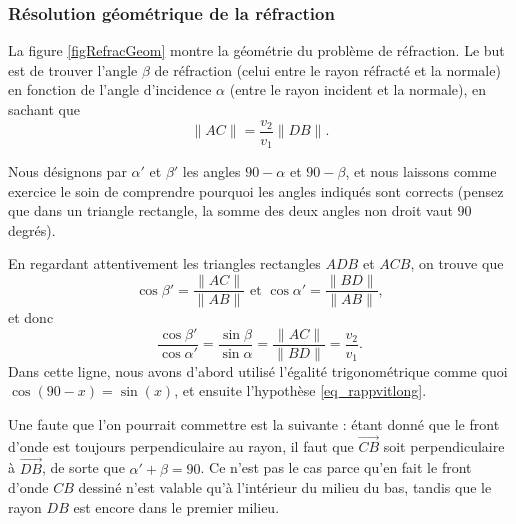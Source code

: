 \subsubsection{Résolution géométrique de la réfraction}

La figure \ref{figRefracGeom} montre la géométrie du problème de réfraction. Le but est de trouver l'angle $\beta$ de réfraction (celui entre le rayon réfracté et la normale) en fonction de l'angle d'incidence $\alpha$ (entre le rayon incident et la normale), en sachant que 
\begin{equation}  \label{eq_rappvitlong}
  \| AC \|=\frac{ v_{2} }{ v_{1} }\| DB \|.
\end{equation}


Nous désignons par $\alpha'$ et $\beta'$ les angles $90-\alpha$ et $90-\beta$, et nous laissons comme exercice le soin de comprendre pourquoi les angles indiqués sont corrects (pensez que dans un triangle rectangle, la somme des deux angles non droit vaut $90$ degrés). 

En regardant attentivement les triangles rectangles $ADB$ et $ACB$, on trouve que 
\[
  \cos\beta'=\frac{ \| AC\| }{ \| AB \| }\text{ et }
  \cos\alpha'=\frac{ \| BD \| }{ \| AB \| },
\]
et donc
\begin{equation}   \label{EqCossinVV}
\frac{ \cos\beta' }{ \cos\alpha' }=\frac{ \sin\beta }{ \sin\alpha }=\frac{ \| AC \| }{ \| BD \| }=\frac{ v_{2} }{ v_{1} }.
\end{equation}
Dans cette ligne, nous avons d'abord utilisé l'égalité trigonométrique comme quoi $\cos(90-x)=\sin(x)$, et ensuite l'hypothèse \eqref{eq_rappvitlong}. 

Une faute que l'on pourrait commettre est la suivante : étant donné que le front d'onde est toujours perpendiculaire au rayon, il faut que $\overrightarrow{CB}$ soit perpendiculaire à $\overrightarrow{DB}$, de sorte que $\alpha'+\beta=90$. Ce n'est pas le cas parce qu'en fait le front d'onde $CB$ dessiné n'est valable qu'à l'intérieur du milieu du bas, tandis que le rayon $DB$ est encore dans le premier milieu.

